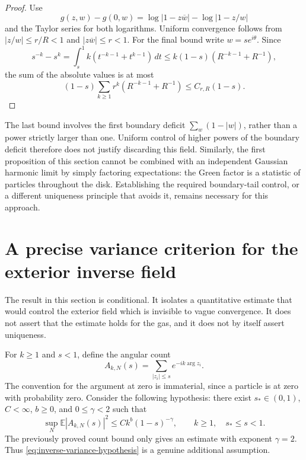 \documentclass[11pt,a4paper]{article}
\numberwithin{equation}{section}
\theoremstyle{definition}
\theoremstyle{remark}
\begin{document}
\begin{proof}
Use
\[
 g(z,w)-g(0,w)
 =\log|1-z\overline w|-\log|1-z/w|
\]
and the Taylor series for both logarithms.  Uniform convergence follows
from $|z/w|\le r/R<1$ and $|z\overline w|\le r<1$.
For the final bound write $w=s e^{i\theta}$.  Since
\[
 s^{-k}-s^k=\int_s^1 k(t^{-k-1}+t^{k-1})\,dt
 \le k(1-s)(R^{-k-1}+R^{-1}),
\]
the sum of the absolute values is at most
\[
 (1-s)\sum_{k\ge1}r^k(R^{-k-1}+R^{-1})
 \le C_{r,R}(1-s).
\]
\end{proof}

The last bound involves the first boundary deficit
$\sum_w(1-|w|)$, rather than a power strictly larger than one.  Uniform
control of higher powers of the boundary deficit therefore does not
justify discarding this field.  Similarly, the first proposition of this
section cannot be combined with an independent Gaussian harmonic limit
by simply factoring expectations: the Green factor is a statistic of
particles throughout the disk.  Establishing the required boundary-tail
control, or a different uniqueness principle that avoids it, remains
necessary for this approach.

\section{A precise variance criterion for the exterior inverse field}
\label{sec:inverse-field-variance-criterion}

The result in this section is conditional. It isolates a quantitative
estimate that would control the exterior field which is invisible to
vague convergence. It does not assert that the estimate holds for the gas,
and it does not by itself assert uniqueness.

For $k\geq1$ and $s<1$, define the angular count
\[
 A_{k,N}(s)=\sum_{|z_i|\leq s}e^{-ik\arg z_i}.
\]
The convention for the argument at zero is immaterial, since a particle
is at zero with probability zero. Consider the following hypothesis:
there exist $s_*\in(0,1)$, $C<\infty$, $b\geq0$, and $0\leq\gamma<2$ such that
\begin{equation}\label{eq:inverse-variance-hypothesis}
 \sup_N\mathbb E|A_{k,N}(s)|^2
 \leq C k^b(1-s)^{-\gamma},
 \qquad k\geq1,\quad s_*\leq s<1.
\end{equation}
The previously proved count bound only gives an estimate with exponent
$\gamma=2$. Thus \eqref{eq:inverse-variance-hypothesis} is a genuine
additional assumption.
\end{document}
